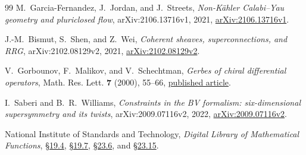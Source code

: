 \documentclass[11pt]{article}
\numberwithin{equation}{section}
\begin{document}
\begin{thebibliography}{99}
M.~Garcia-Fernandez, J.~Jordan, and J.~Streets,
\emph{Non-K\"ahler Calabi--Yau geometry and pluriclosed flow},
arXiv:2106.13716v1, 2021,
\href{https://arxiv.org/abs/2106.13716v1}{arXiv:2106.13716v1}.

J.-M.~Bismut, S.~Shen, and Z.~Wei,
\emph{Coherent sheaves, superconnections, and RRG},
arXiv:2102.08129v2, 2021,
\href{https://arxiv.org/abs/2102.08129v2}{arXiv:2102.08129v2}.

V.~Gorbounov, F.~Malikov, and V.~Schechtman,
\emph{Gerbes of chiral differential operators},
Math. Res. Lett. \textbf{7} (2000), 55--66,
\href{https://archive.intlpress.com/site/pub/files/_fulltext/journals/mrl/2000/0007/0001/MRL-2000-0007-0001-a005.pdf}
{published article}.

I.~Saberi and B.~R.~Williams,
\emph{Constraints in the BV formalism: six-dimensional
supersymmetry and its twists},
arXiv:2009.07116v2, 2022,
\href{https://arxiv.org/abs/2009.07116v2}{arXiv:2009.07116v2}.

National Institute of Standards and Technology,
\emph{Digital Library of Mathematical Functions},
\href{https://dlmf.nist.gov/19.4}{\S19.4},
\href{https://dlmf.nist.gov/19.7}{\S19.7},
\href{https://dlmf.nist.gov/23.6}{\S23.6}, and
\href{https://dlmf.nist.gov/23.15}{\S23.15}.

\end{thebibliography}
\end{document}
